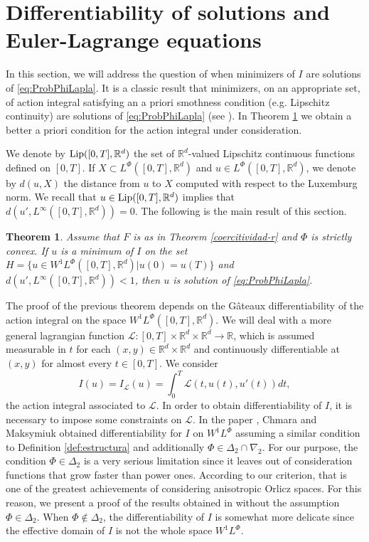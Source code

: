 \documentclass[twoside]{article}
\newtheorem{thm}{Theorem}[section]
\theoremstyle{remark}
\newcommand{\lphi}{L^{\Phi}}
\newcommand{\wphi}{W^{1}\lphi}
\newcommand{\rr}{\mathbb{R}}
\newcommand{\lip}{\mathop{\rm Lip}}
\begin{document}
\section{Differentiability of solutions and Euler-Lagrange equations}\label{sec:diferenciabilidad}


In this section, we will address the question of when minimizers of $I$ are solutions of \eqref{eq:ProbPhiLapla}. It is a classic result that minimizers, on an appropriate set, of action integral satisfying an a priori smothness condition (e.g. Lipschitz continuity) are solutions of \eqref{eq:ProbPhiLapla} (see \cite{buttazzo1998one}).  In Theorem \ref{th:tor_prin} we obtain a better a priori condition for the action integral under consideration.

We denote by $\lip([0,T],\rr^d)$ the set of $\rr^d$-valued Lipschitz continuous functions defined on $[0,T]$. If $X\subset \lphi([0,T],\rr^d)$ and $u\in \lphi([0,T],\rr^d)$,  we denote by $d(u,X)$ the distance from $u$ to $X$ computed with respect  to the Luxemburg norm. We recall that  $u\in\lip([0,T],\rr^d)$ implies that $d(u',L^{\infty}([0,T],\rr^d))=0$. The following is the main result of this section.




\begin{thm}\label{th:tor_prin} Assume   that $F$ is as in Theorem \ref{coercitividad-r} and $\Phi$ is  strictly convex. If $u$ is a minimum of $I$ on the set $H=\{u\in\wphi([0,T],\rr^d)| u(0)=u(T)\}$ and $d(u',L^{\infty}([0,T],\rr^d))<1$, then $u$ is solution of \eqref{eq:ProbPhiLapla}. 
\end{thm}


The proof of the previous theorem depends on the G\^ateaux differentiability of the action integral on the space $\wphi([0,T],\rr^d)$. We will deal with a more general lagrangian function $\mathcal{L}:[0,T]\times\rr^d\times\rr^d\to\rr$, which  is assumed  measurable in $t$ for each $(x,y)\in \rr^d\times\rr^d$ and  continuously differentiable at $(x,y)$ for almost every $t \in [0,T]$. We consider 
\begin{equation}\label{eq:integral_accion_gen} I(u)=I_{\mathcal{L}}(u)=\int_0^T\mathcal{L}(t,u(t),u'(t))dt,\tag{$IG$}
\end{equation}
 the action integral associated to $\mathcal{L}$. In order to obtain differentiability of $I$, it is necessary to impose some constraints on $\mathcal{L}$. In the paper \cite{chamra2017anisotropic}, Chmara and Maksymiuk  obtained differentiability for $I$ on $\wphi$ assuming  a similar condition  to Definition \ref{def:estructura} and additionally $\Phi\in\Delta_2\cap\nabla_2$. For our purpose, the condition $\Phi\in\Delta_2$ is a very serious limitation     since it leaves out of consideration functions that grow faster than power ones. According to our criterion, that is one of the greatest achievements of considering anisotropic Orlicz spaces.  For this reason, we present a proof  of the results obtained in \cite{chamra2017anisotropic} without the assumption $\Phi\in\Delta_2$. When $\Phi\notin\Delta_2$, the  differentiability of $I$ is somewhat more delicate since the effective domain of $I$ is not the whole space $\wphi$. 
\end{document}
